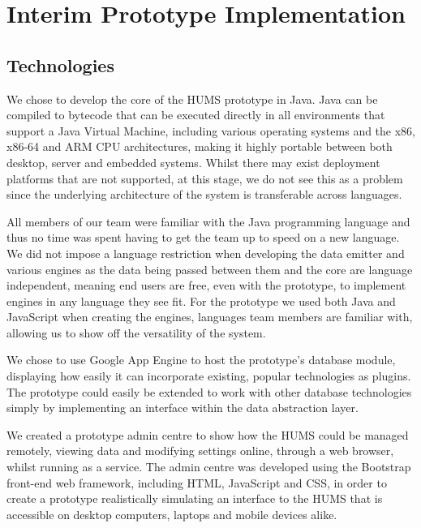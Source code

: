 \section{Interim Prototype Implementation}
\label{sec:prototype}

\subsection{Technologies}
\label{sec:prototype-technologies}

We chose to develop the core of the HUMS prototype in Java. Java can be compiled to bytecode that can be executed directly in all environments that support a Java Virtual Machine, including various operating systems and the x86, x86-64 and ARM CPU architectures, making it highly portable between both desktop, server and embedded systems. %
Whilst there may exist deployment platforms that are not supported, at this stage, we do not see this as a problem since the underlying architecture of the system is transferable across languages.

All members of our team were familiar with the Java programming language and thus no time was spent having to get the team up to speed on a new language. We did not impose a language restriction when developing the data emitter and various engines as the data being passed between them and the core are language independent, meaning end users are free, even with the prototype, to implement engines in any language they see fit. For the prototype we used both Java and JavaScript when creating the engines, languages team members are familiar with, allowing us to show off the versatility of the system.

We chose to use Google App Engine to host the prototype's database module, displaying how easily it can incorporate existing, popular technologies as plugins. The prototype could easily be extended to work with other database technologies simply by implementing an interface within the data abstraction layer.

We created a prototype admin centre to show how the HUMS could be managed remotely, viewing data and modifying settings online, through a web browser, whilst running as a service. The admin centre was developed using the Bootstrap front-end web framework, including HTML, JavaScript and CSS, in order to create a prototype realistically simulating an interface to the HUMS that is accessible on desktop computers, laptops and mobile devices alike.

